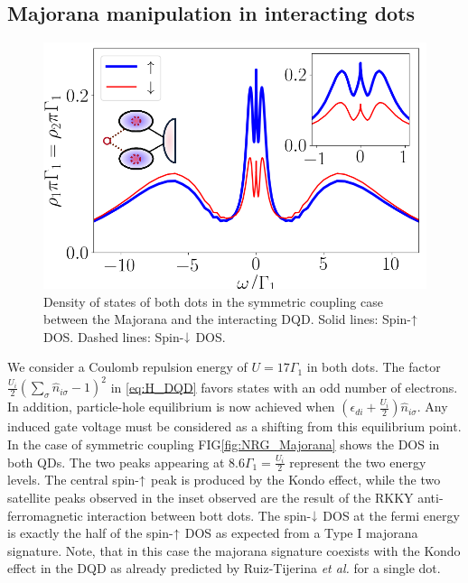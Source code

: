 \documentclass[showpacs,aps,prb,reprint,superscriptaddress]{revtex4-1}
\begin{document}
    \subsection{Majorana manipulation in interacting dots}

\begin{figure}[t]
\begin{center}
\includegraphics[scale=0.4]{Graficos/NRG-t1=t2.png}
\caption{  \label{fig:NRG_Majorana} Density of states of both dots in the symmetric coupling case between the Majorana and the interacting DQD. Solid lines: Spin-$\uparrow$ DOS. Dashed lines: Spin-$\downarrow$ DOS. 
}
\label{fig:GenModel}
\end{center}
\end{figure}
    

    
    We consider a Coulomb repulsion energy of $U = 17\Gamma_1$ in both dots. The factor $ \frac{U_i}{2}(\sum_{\sigma} \hat{n}_{i\sigma}-1)^{2}$ in \eqref{eq:H_DQD} favors states with an odd number of electrons. In addition, particle-hole equilibrium is now achieved when $\left(\epsilon_{di}+\frac{U_i}{2}\right)\hat{n}_{i\sigma}$. Any induced gate voltage must be considered as a shifting from this equilibrium point. In the case of symmetric coupling FIG\ref{fig:NRG_Majorana} shows the DOS in both QDs. The two peaks appearing at $8.6\Gamma_1 = \frac{U_i}{2}$ represent the two energy levels. The central spin-$\uparrow$ peak is produced by the Kondo effect, \cite{hewson_kondo_1997,wilson_renormalization_1975}  while the two satellite peaks observed in the inset observed are the result of the  RKKY anti-ferromagnetic interaction between bott dots.  \cite{ruderman_indirect_1954,kasuya_theory_1956,yosida_magnetic_1957} The spin-$\downarrow$ DOS at the fermi energy  is exactly the half of the spin-$\uparrow$ DOS as expected from a Type I majorana signature. Note, that in this case the majorana signature coexists with the Kondo effect in the DQD as already predicted by Ruiz-Tijerina \textit{et al.} for a single dot. \cite{ruiz-tijerina_interaction_2015}
    
\end{document}
